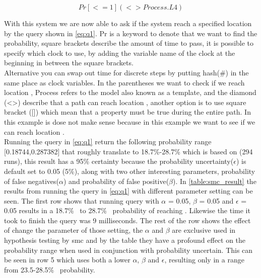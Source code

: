 \begin{equation}\label{eq:q1}
Pr[<=1](<> Process.L4)
\end{equation}

With this system we are now able to ask if the system reach a specified location by the query shown in \cref{eq:q1}. Pr is a keyword to denote that we want to find the probability, square brackets describe the amount of time to pass, it is possible to specify which clock to use, by adding the variable name of the clock at the beginning in between the square brackets. \\
Alternative you can swap out time for discrete steps by putting hash(\#) in the same place as clock variables. In the parentheses we want to check if we reach location , Process refers to the model also known as a template, and the diamond (<>) describe that a path can reach location , another option is to use square bracket ([]) which mean that a property must be true during the entire path. In this example is dose not make sense because in this example we want to see if we can reach location . \\
Running the query in \cref{eq:q1} return the following probability range [0.18744,0.287382] that roughly translate to 18.7\%-28.7\% which is based on (294 runs), this result has a 95\% certainty because the probability uncertainty($\epsilon$) is default set to 0.05 (5\%), along with two other interesting parameters, probability of false negatives($\alpha$) and probability of false positive($\beta$). In \cref{table:smc_result} the results from running the query in \cref{eq:q1} with different parameter setting can be seen. The first row shows that running query with $\alpha$ = 0.05, $\beta$ = 0.05 and $\epsilon$ = 0.05 results in a 18.7\%~ to 28.7\%~ probability of reaching . Likewise the time it took to finish the query was 9 milliseconds. The rest of the row shows the effect of change the parameter of those setting, the $\alpha$ and $\beta$ are exclusive used in hypothesis testing by \gls{smc}  and by the table they have a profound effect on the probability range when used in conjunction with probability uncertain. This can be seen in row 5 which uses both a lower $\alpha$, $\beta$ and $\epsilon$, resulting only in a range from 23.5-28.5\%~ probability.

